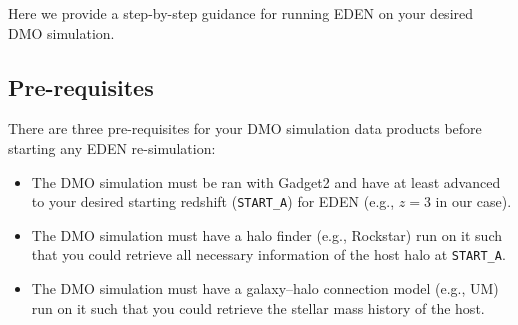 \documentclass[12pt]{article}
\begin{document}
    Here we provide a step-by-step guidance for running EDEN on your desired DMO simulation. 
    
    \subsection{Pre-requisites}
    There are three pre-requisites for your DMO simulation data products before starting any EDEN re-simulation:
    \begin{itemize}
        \item The DMO simulation must be ran with Gadget2 and have at least advanced to your desired starting redshift (\texttt{START\_A}) for EDEN (e.g., $z=3$ in our case).
        \item The DMO simulation must have a halo finder (e.g., Rockstar) run on it such that you could retrieve all necessary information of the host halo at \texttt{START\_A}.
        \item The DMO simulation must have a galaxy--halo connection model (e.g., UM) run on it such that you could retrieve the stellar mass history of the host.
    \end{itemize} 
\end{document}
